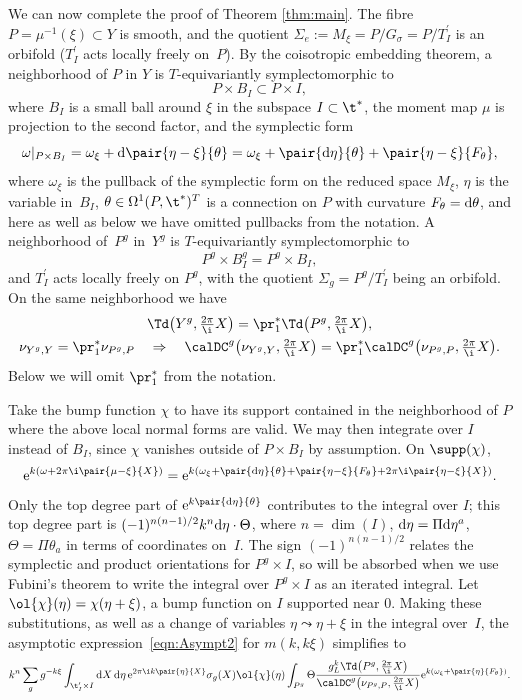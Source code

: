  We can now complete the proof of Theorem \ref{thm:main}. The fibre $P=\mu^{-1}(\xi) \subset Y$ is smooth, and the quotient $\Sigma_e:=M_\xi=P/G_\sigma=P/T_I^\prime$ is an orbifold ($T_I^\prime$ acts locally freely on~$P$). By the coisotropic embedding theorem, a neighborhood of $P$ in $Y$ is $T$-equivariantly symplectomorphic to
\[ P \times B_I \subset P \times I, \]
where $B_I$ is a small ball around $\xi$ in the subspace $I \subset \t^\ast$, the moment map $\mu$ is projection to the second factor, and the symplectic form
\[ \omega|_{P\times B_I}=\omega_\xi+{\rm d}\pair{\eta-\xi}{\theta}=\omega_\xi+\pair{{\rm d}\eta}{\theta}+\pair{\eta-\xi}{F_\theta},\]
where $\omega_\xi$ is the pullback of the symplectic form on the reduced space $M_\xi$, $\eta$ is the variable in~$B_I$, $\theta \in \Omega^1(P,\t^\ast)^T$ is a connection on $P$ with curvature $F_\theta={\rm d}\theta$, and here as well as below we have omitted pullbacks from the notation. A neighborhood of~$P^g$ in~$Y^g$ is $T$-equivariantly symplectomorphic to
\[ P^g \times B_I^g=P^g \times B_I,\]
and $T_I^\prime$ acts locally freely on $P^g$, with the quotient $\Sigma_g=P^g/T_I^\prime$ being an orbifold. On the same neighborhood we have{\samepage
\begin{gather*} \Td\big(Y^g,\tfrac{2\pi}{\i}X\big)=\pr_1^\ast \Td\big(P^g,\tfrac{2\pi}{\i}X\big),\\
\nu_{Y^g,Y}=\pr_1^\ast \nu_{P^g,P} \quad \Rightarrow \quad \calDC^g\big(\nu_{Y^g,Y},\tfrac{2\pi}{\i}X\big)=\pr_1^\ast \calDC^g\big(\nu_{P^g,P},\tfrac{2\pi}{\i}X\big).
\end{gather*}
Below we will omit $\pr_1^\ast$ from the notation.}

Take the bump function $\chi$ to have its support contained in the neighborhood of $P$ where the above local normal forms are valid. We may then integrate over $I$ instead of $B_I$, since $\chi$ vanishes outside of $P\times B_I$ by assumption. On $\supp(\chi)$,
\[ {\rm e}^{k(\omega+2\pi \i\pair{\mu-\xi}{X})}={\rm e}^{k(\omega_\xi+\pair{{\rm d}\eta}{\theta}+\pair{\eta-\xi}{F_\theta}+2\pi \i\pair{\eta-\xi}{X})}.\]
Only the top degree part of ${\rm e}^{k\pair{{\rm d}\eta}{\theta}}$ contributes to the integral over $I$; this top degree part is $(-1)^{n(n-1)/2}k^n {\rm d}\eta \cdot \Theta$, where $n=\dim(I)$, ${\rm d}\eta=\Pi  {\rm d}\eta^a$, $\Theta=\Pi \theta_a$ in terms of coordinates on~$I$. The sign $(-1)^{n(n-1)/2}$ relates the symplectic and product orientations for $P^g \times I$, so will be absorbed when we use Fubini's theorem to write the integral over $P^g\times I$ as an iterated integral. Let $\ol{\chi}(\eta)=\chi(\eta+\xi)$, a bump function on $I$ supported near $0$. Making these substitutions, as well as a change of variables $\eta \leadsto \eta+\xi$ in the integral over~$I$, the asymptotic expression~\eqref{eqn:Asympt2} for $m(k,k\xi)$ simplifies to
\begin{gather*}%
k^n\sum_g g^{-k\xi} \int_{\t_I^\prime \times I} {\rm d}X\, {\rm d}\eta\,{\rm e}^{2\pi \i k\pair{\eta}{X}} \sigma_g(X)\ol{\chi}(\eta) \int_{P^g} \Theta \frac{g_L^k\Td\big(P^g,\tfrac{2\pi}{\i}X\big)}{\calDC^g\big(\nu_{P^g,P},\tfrac{2\pi}{\i}X\big)}{\rm e}^{k(\omega_\xi+\pair{\eta}{F_\theta})}.
\end{gather*}

